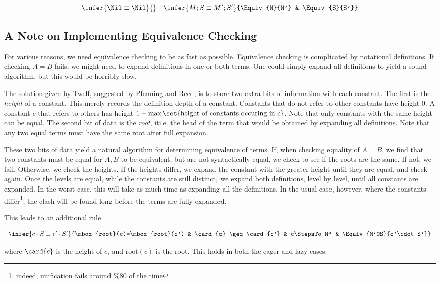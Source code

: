 \bigskip 
{}
\bigskip 

$$
\begin{array}{lcr}
\infer{\Equiv{\Nil}{\Nil}}{} &
\infer{\Equiv{M;S}{M';S'}}{\Equiv{M}{M'} & \Equiv{S}{S'}}
\end{array} 
$$

\subsection{A Note on Implementing Equivalence Checking}

  For various reasons, we need equivalence checking to
be as fast as possible.  Equivalence checking is complicated
by notational definitions.  If checking $A=B$ fails, we might need
to expand definitions in one or both terms.  One could simply
expand all definitions to yield a sound algorithm, but this would
be horribly slow.  

  The solution given by Twelf, suggested by 
Pfenning and Reed, is to store two extra bits of information 
with each constant.  The first is the \emph{height} of a constant.
This merely records the definition depth of a constant.  Constants that
do not refer to other constants have height 0.  A constant $c$ that refers
to others has height $1 + \max\set{\mbox{height of constants occuring in } c}$.
Note that only constants with the same height can be equal.  
The second bit of data is the \emph{root}, it{i.e.} the head of the term that would be obtained by 
expanding all definitions.  Note that any two equal terms must have the
same root after full expansion. 

These two bits of data yield a natural algorithm for determining 
equivalence of terms.  If, when checking equality of $A=B$,
we find that two constants must be equal for $A,B$ to
be equivalent, but are not syntactically equal, 
we check to see if the roots are the same.
If not, we fail.  Otherwise, we check the heights.  If the heights
differ, we expand the constant with the greater height until 
they are equal, and check again.  Once the levels
are equal, while the constants are still distinct, we 
expand both definitions, level by level, until all constants
are expanded.  In the worst case, this will take as much time
as expanding all the definitions.  In the usual case, however,
where the constants differ\footnote{indeed, unification fails
around \%80 of the time}, the clash will be found long before
the terms are fully expanded.  

This leads to an additional rule 

\newcommand{\Root}{\mbox{root}}
$$
\begin{array}{cccc}
\infer{\Equiv{c\cdot S}{c'\cdot S'}}{\Root(c)=\Root(c') & \card{c} \geq \card{c'} & c\StepsTo M' & \Equiv{M'@S}{c'\cdot S'}} 
\end{array} 
$$

where $\card{c}$ is the height of $c$, and $\Root(c)$ is the root.
This holds in both the eager and lazy cases.
